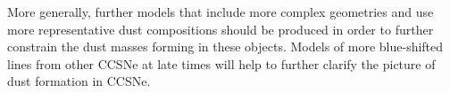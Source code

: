 More generally, further models that include more complex geometries and use  more representative dust  compositions should be produced in order to further constrain the dust masses forming in these objects. Models of more blue-shifted lines from other CCSNe at late times will help to further clarify the picture of dust formation in CCSNe.

%
% 

